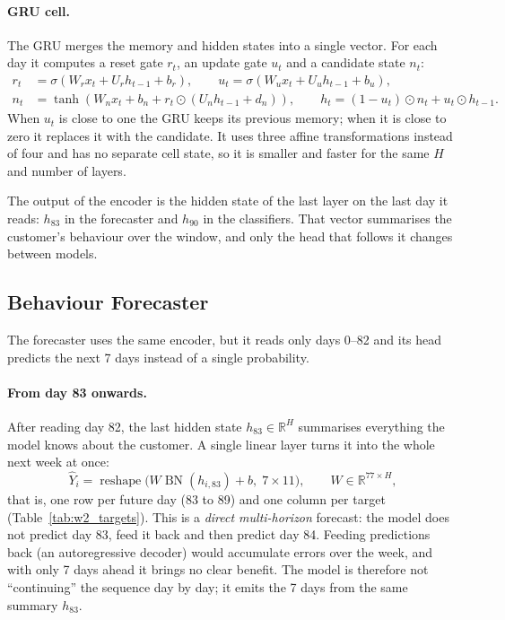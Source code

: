 \documentclass{article}
\newcommand{\R}{\mathbb{R}}
\begin{document}
\paragraph{GRU cell.} The GRU merges the memory and hidden states into a single vector. For each day it computes a reset gate $r_t$, an update gate $u_t$ and a candidate state $n_t$:
\begin{align}
r_t &= \sigma(W_r x_t + U_r h_{t-1} + b_r), \qquad
u_t = \sigma(W_u x_t + U_u h_{t-1} + b_u), \\
n_t &= \tanh\!\left(W_n x_t + b_n + r_t \odot (U_n h_{t-1} + d_n)\right), \qquad
h_t = (1-u_t) \odot n_t + u_t \odot h_{t-1}.
\end{align}
When $u_t$ is close to one the GRU keeps its previous memory; when it is close to zero it replaces it with the candidate. It uses three affine transformations instead of four and has no separate cell state, so it is smaller and faster for the same $H$ and number of layers.

The output of the encoder is the hidden state of the last layer on the last day it reads: $h_{83}$ in the forecaster and $h_{90}$ in the classifiers. That vector summarises the customer's behaviour over the window, and only the head that follows it changes between models.

\subsection{Behaviour Forecaster}

The forecaster uses the same encoder, but it reads only days 0--82 and its head predicts the next 7 days instead of a single probability.

\paragraph{From day 83 onwards.} After reading day 82, the last hidden state $h_{83} \in \R^{H}$ summarises everything the model knows about the customer. A single linear layer turns it into the whole next week at once:
\begin{equation}
\hat{Y}_i = \operatorname{reshape}\big(W \operatorname{BN}(h_{i,83}) + b,\; 7 \times 11\big), \qquad W \in \R^{77 \times H},
\end{equation}
that is, one row per future day (83 to 89) and one column per target (Table~\ref{tab:w2_targets}). This is a \emph{direct multi-horizon} forecast: the model does not predict day 83, feed it back and then predict day 84. Feeding predictions back (an autoregressive decoder) would accumulate errors over the week, and with only 7 days ahead it brings no clear benefit. The model is therefore not ``continuing'' the sequence day by day; it emits the 7 days from the same summary $h_{83}$.
\end{document}
